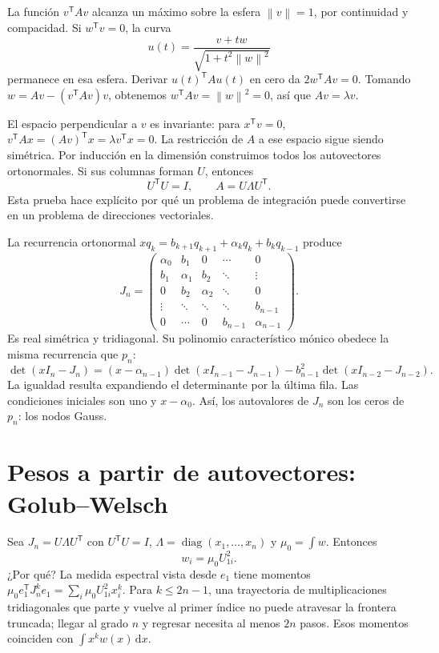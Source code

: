 \documentclass[11pt,a4paper]{article}
\newcommand{\dd}{\,\mathrm d}
\newcommand{\T}{^{\mathsf T}}
\newcommand{\norm}[1]{\left\lVert #1\right\rVert}
\DeclareMathOperator{\diag}{diag}
\theoremstyle{definition}
\newcounter{problema}
\begin{document}
La función $v^{\mathsf T}Av$ alcanza un máximo sobre la esfera $\norm v=1$, por continuidad y compacidad. Si $w^{\mathsf T}v=0$, la curva
\[
u(t)=\frac{v+tw}{\sqrt{1+t^2\norm w^2}}
\]
permanece en esa esfera. Derivar $u(t)^{\mathsf T}Au(t)$ en cero da $2w^{\mathsf T}Av=0$. Tomando $w=Av-(v^{\mathsf T}Av)v$, obtenemos $w^{\mathsf T}Av=\norm w^2=0$, así que $Av=\lambda v$.

El espacio perpendicular a $v$ es invariante: para $x^{\mathsf T}v=0$,
$v^{\mathsf T}Ax=(Av)^{\mathsf T}x=\lambda v^{\mathsf T}x=0$.
La restricción de $A$ a ese espacio sigue siendo simétrica. Por inducción en la dimensión construimos todos los autovectores ortonormales. Si sus columnas forman $U$, entonces
\[
U^{\mathsf T}U=I,\qquad A=U\Lambda U^{\mathsf T}.
\]
Esta prueba hace explícito por qué un problema de integración puede convertirse en un problema de direcciones vectoriales.

La recurrencia ortonormal
$xq_k=b_{k+1}q_{k+1}+\alpha_kq_k+b_kq_{k-1}$
produce
\[
J_n=\begin{pmatrix}
\alpha_0&b_1&0&\cdots&0\\
b_1&\alpha_1&b_2&\ddots&\vdots\\
0&b_2&\alpha_2&\ddots&0\\
\vdots&\ddots&\ddots&\ddots&b_{n-1}\\
0&\cdots&0&b_{n-1}&\alpha_{n-1}
\end{pmatrix}.
\]
Es real simétrica y tridiagonal. Su polinomio característico mónico obedece la misma recurrencia que $p_n$:
\[
\det(xI_n-J_n)=(x-\alpha_{n-1})\det(xI_{n-1}-J_{n-1})
-b_{n-1}^2\det(xI_{n-2}-J_{n-2}).
\]
La igualdad resulta expandiendo el determinante por la última fila. Las condiciones iniciales son uno y $x-\alpha_0$. Así, los autovalores de $J_n$ son los ceros de $p_n$: los nodos Gauss.

\section{Pesos a partir de autovectores: Golub--Welsch}
Sea $J_n=U\Lambda U\T$ con $U\T U=I$, $\Lambda=\diag(x_1,\ldots,x_n)$ y $\mu_0=\int w$. Entonces
\[
w_i=\mu_0 U_{1i}^2.
\]
¿Por qué? La medida espectral vista desde $e_1$ tiene momentos
$\mu_0e_1\T J_n^k e_1=\sum_i\mu_0U_{1i}^2x_i^k$. Para $k\le2n-1$, una trayectoria de multiplicaciones tridiagonales que parte y vuelve al primer índice no puede atravesar la frontera truncada; llegar al grado $n$ y regresar necesita al menos $2n$ pasos. Esos momentos coinciden con $\int x^kw(x)\dd x$.
\end{document}
